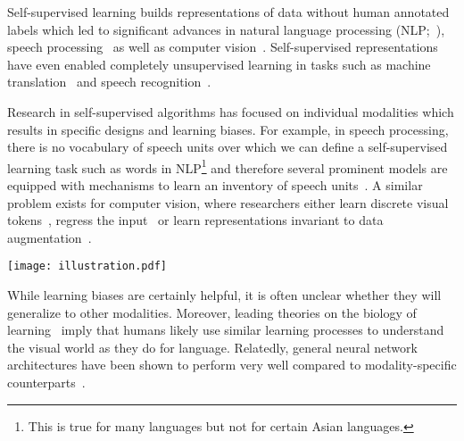 \documentclass[nohyperref]{article}
\theoremstyle{plain}
\theoremstyle{definition}
\theoremstyle{remark}
\newcommand{\name}{data2vec}
\begin{document}
Self-supervised learning builds representations of data without human annotated labels which led to significant advances in natural language processing (NLP;~\citealt{peters2018acl,radford2018unsup,devlin2018bert,brown2020gpt3}), speech processing~\citep{oord2018cpc,schneider2019wav2vec,baevski2020wav} as well as computer vision~\citep{chen2020simple,chen2021mocov3,caron2021dino,bao2021beit,he2021mae}.
Self-supervised representations have even enabled completely unsupervised learning in tasks such as machine translation~\citep{lample2018unsupmt} and speech recognition~\citep{baevski2021unsupervised}.

Research in self-supervised algorithms has focused on individual modalities which results in specific designs and learning biases.
For example, in speech processing, there is no vocabulary of speech units over which we can define a self-supervised learning task such as words in NLP\footnote{This is true for many languages but not for certain Asian languages.} and therefore several prominent models are equipped with mechanisms to learn an inventory of speech units~\citep{baevski2020wav,hsu2020hubert}.
A similar problem exists for computer vision, where researchers either learn discrete visual tokens~\citep{radford2021clip,bao2021beit}, regress the input~\citep{he2021mae} or learn representations invariant to data augmentation~\citep{chen2020simple,grill2020byol,caron2021dino}.

\begin{figure*}[h!t]
\begin{center}
\texttt{[image: illustration.pdf]}
\caption{Illustration of how \name{} follows the same learning process for different modalities. 
The model first produces representations of the original input example (teacher mode) which are then regressed by the same model based on a masked version of the input. 
The teacher parameters are an exponentially moving average of the student weights. 
The student predicts the average of  network layers of the teacher (shaded in blue). 
\label{fig:model}
}
\end{center}
\end{figure*}


While learning biases are certainly helpful, it is often unclear whether they will generalize to other modalities.
Moreover, leading theories on the biology of learning~\citep{friston2009predictive,friston2010free} imply that humans likely use similar learning processes to understand the visual world as they do for language.
Relatedly, general neural network architectures have been shown to perform very well compared to modality-specific counterparts~\citep{jaegle2021perceiver}.
\end{document}
